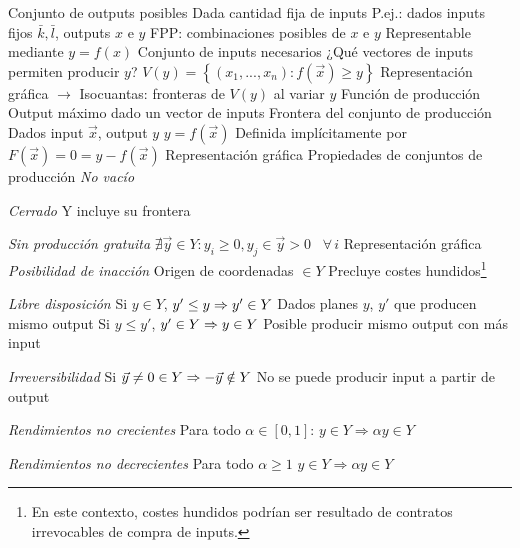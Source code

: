 \documentclass{nuevotema}
\begin{document}
\begin{esquemal}
				\4 Conjunto de outputs posibles
				\4[] Dada cantidad fija de inputs
				\4[] P.ej.: dados inputs fijos $\bar{k}, \bar{l}$, outputs $x$ e $y$
				\4[] FPP: combinaciones posibles de $x$ e $y$
				\4[] Representable mediante $y = f(x)$
			\3 Conjunto de inputs necesarios
				\4 ¿Qué vectores de inputs permiten producir $y$?
				\4[] $V(y) = \left\lbrace \left( x_1, ..., x_n \right): f(\vec{x}) \geq y \right\rbrace$
				\4 Representación gráfica
				\4[] 
				\4[] $\to$ Isocuantas: fronteras de $V(y)$ al variar $y$
			\3 Función de producción
				\4 Output máximo dado un vector de inputs
				\4 Frontera del conjunto de producción
				\4[$\to$] Dados input $\vec{x}$, output $y$
				\4[] $y=f(\vec{x})$
				\4[] Definida implícitamente por $F(\vec{x}) = 0 = y - f(\vec{x})$
				\4 Representación gráfica
				\4[] 
			\3 Propiedades de conjuntos de producción
				\4[(i)] \textit{No vacío}
				
				\4[(ii)] \textit{Cerrado}
				\4[] Y incluye su frontera
				
				\4[(iii)] \textit{Sin producción gratuita}
				\4[] $\nexists \vec{y} \in Y : y_i \geq 0, y_j \in \vec{y} > 0$ \, $\forall \, i $
				\4 Representación gráfica
				\4[] 
				\4[(iv)] \textit{Posibilidad de inacción}
				\4[] Origen de coordenadas $\in Y$
				\4[] Precluye costes hundidos\footnote{En este contexto, costes hundidos podrían ser resultado de contratos irrevocables de compra de inputs.}
				\4[] 
				
				\4[(v)] \textit{Libre disposición}
				\4[] Si $y \in Y$, $y' \leq y \Rightarrow y' \in Y$
				\4[] Dados planes $y$, $y'$ que producen mismo output
				\4[] Si $y \leq y'$, $y' \in Y \Rightarrow y \in Y$
				\4[] Posible producir mismo output con más input
				
				\4[] 
				
				\4[(vi)] \textit{Irreversibilidad}
				\4[] Si $\vec{y} \neq 0 \in Y \Rightarrow -\vec{y} \notin Y$
				\4[] No se puede producir input a partir de output
				\4[] 
				
				\4[(vii)] \textit{Rendimientos no crecientes}
				\4[] Para todo $\alpha \in [0,1]$:
				\4[] $y \in Y \Rightarrow \alpha y \in Y$
				\4[] 
				
				\4[(viii)] \textit{Rendimientos no decrecientes}
				\4[] Para todo $\alpha \geq 1$
				\4[] $y \in Y \Rightarrow \alpha y \in Y$
				\4[] 
				

\end{esquemal}
\end{document}
